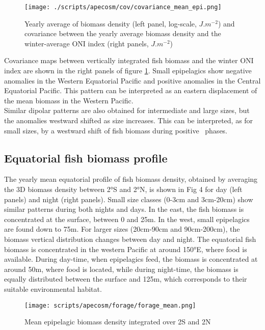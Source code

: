 \begin{figure}[h!]
    \centering
    \texttt{[image: ./scripts/apecosm/cov/covariance\_mean\_epi.png]}
    \caption{Yearly average of biomass density (left panel, log-scale, $J.m^{-2}$) and 
    covariance between the yearly average biomass density and the winter-average ONI index (right panels, $J.m^{-2}$)}
    \label{fig:mean-cov-ape}
\end{figure}

Covariance maps between vertically integrated fish biomass and the winter ONI index are shown in the right panels of figure \ref{fig:mean-cov-ape}. 
Small epipelagics show negative anomalies in the Western Equatorial Pacific and positive anomalies in the Central Equatorial Pacific. This pattern can be interpreted as an eastern displacement of the mean biomass in the Western Pacific.\\

Similar dipolar patterns are also obtained for intermediate and large sizes, but the anomalies westward shifted as size increases. This can be interpreted, as for small sizes, by a westward shift of fish biomass during positive \nino\ phases.\\

\subsection{Equatorial fish biomass profile}

The yearly mean equatorial profile of fish biomass density, obtained by averaging the 3D biomass density between 2°S and 2°N, is shown in Fig 4 for day (left panels) and night (right panels). Small size classes (0-3cm and 3cm-20cm) show similar patterns during both nights and days. In the east, the fish biomass is concentrated at the surface, between 0 and 25m. In the west, small epipelagics are found down to 75m. For larger sizes (20cm-90cm and 90cm-200cm), the biomass vertical distribution changes between day and night. The equatorial fish biomass is concentrated in the western Pacific at around 150°E, where food is available. During day-time, when epipelagics feed, the biomass is concentrated at around 50m, where food is located, while during night-time, the biomass is equally distributed between the surface and 125m, which corresponds to their suitable environmental habitat.

\begin{figure}[h!]
    \centering	
    \texttt{[image: scripts/apecosm/forage/forage\_mean.png]}
	\caption{Mean epipelagic biomass density integrated over 2\degree S and 2\degree N}
    \label{fig:mean-forage}
\end{figure}


